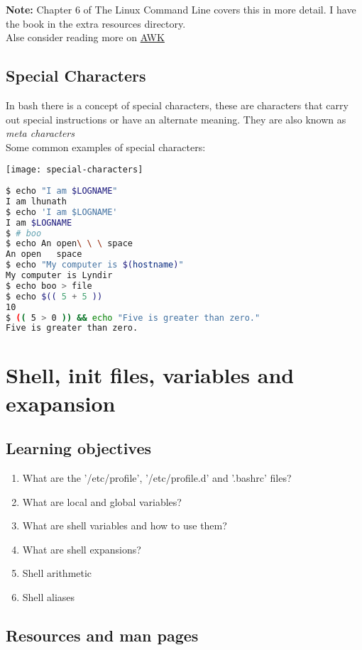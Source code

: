 \documentclass[12pt, letterpaper]{report}
\begin{document}
\textbf{Note:} Chapter 6 of The Linux Command Line covers this in more detail. I have the book in the extra resources directory.\\
Alse consider reading more on \href{http://linuxcommand.org/lc3_adv_awk.php}{AWK}

\section{Special Characters}
In bash there is a concept of special characters, these are characters that 
carry out special instructions or have an alternate meaning. They are also 
known as \textit{meta characters} \\
Some common examples of special characters:
\begin{center}
\texttt{[image: special-characters]}
\end{center}

\begin{lstlisting}[language=Bash,framexleftmargin=5mm,frame=single,xleftmargin=18pt]
$ echo "I am $LOGNAME"
I am lhunath
$ echo 'I am $LOGNAME'
I am $LOGNAME
$ # boo
$ echo An open\ \ \ space
An open   space
$ echo "My computer is $(hostname)"
My computer is Lyndir
$ echo boo > file
$ echo $(( 5 + 5 ))
10
$ (( 5 > 0 )) && echo "Five is greater than zero."
Five is greater than zero.
\end{lstlisting}

\chapter{Shell, init files, variables and exapansion}

\section{Learning objectives}
\begin{enumerate}
	\item What are the '/etc/profile', '/etc/profile.d' and '.bashrc' files?
	\item What are local and global variables?
	\item What are shell variables and how to use them?
	\item What are shell expansions?
	\item Shell arithmetic
	\item Shell aliases
\end{enumerate}

\section{Resources and man pages}
\end{document}
